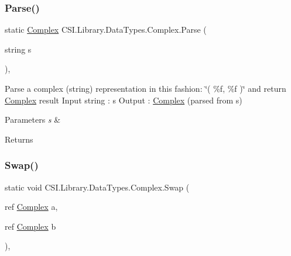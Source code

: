 \subsubsection{\texorpdfstring{Parse()}{Parse()}}
{\footnotesize\ttfamily static \mbox{\hyperlink{struct_c_s_i_1_1_library_1_1_data_types_1_1_complex}{Complex}} C\+S\+I.\+Library.\+Data\+Types.\+Complex.\+Parse (\begin{DoxyParamCaption}\item[{string}]{s }\end{DoxyParamCaption})\hspace{0.3cm}{\ttfamily [inline]}, {\ttfamily [static]}}



Parse a complex (string) representation in this fashion\+: \char`\"{}( \%f, \%f )\char`\"{} and return \mbox{\hyperlink{struct_c_s_i_1_1_library_1_1_data_types_1_1_complex}{Complex}} result Input string \+: s Output \+: \mbox{\hyperlink{struct_c_s_i_1_1_library_1_1_data_types_1_1_complex}{Complex}} (parsed from s) 


\begin{DoxyParams}{Parameters}
{\em s} & \\
\hline
\end{DoxyParams}
\begin{DoxyReturn}{Returns}

\end{DoxyReturn}
\mbox{\label{struct_c_s_i_1_1_library_1_1_data_types_1_1_complex_a2f3a5dd4b452787fece0a51a10eed13c}} 
\subsubsection{\texorpdfstring{Swap()}{Swap()}}
{\footnotesize\ttfamily static void C\+S\+I.\+Library.\+Data\+Types.\+Complex.\+Swap (\begin{DoxyParamCaption}\item[{ref \mbox{\hyperlink{struct_c_s_i_1_1_library_1_1_data_types_1_1_complex}{Complex}}}]{a,  }\item[{ref \mbox{\hyperlink{struct_c_s_i_1_1_library_1_1_data_types_1_1_complex}{Complex}}}]{b }\end{DoxyParamCaption})\hspace{0.3cm}{\ttfamily [inline]}, {\ttfamily [static]}}



